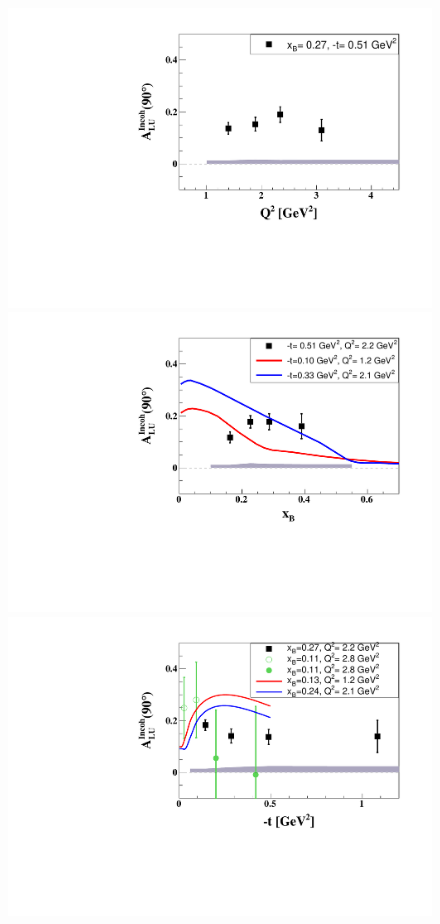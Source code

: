 \begin{figure}[tpb]
   \centering
\includegraphics[scale=0.48]{fig_Dec2016/ALU_90_p_vs_Q2_shortscenrario.pdf}\\ 
\includegraphics[scale=0.48]{fig_Dec2016/ALU_90_p_vs_x_shortscenrario.pdf}\\
\includegraphics[scale=0.48]{fig_Dec2016/ALU_90_p_vs_t_shortscenrario.pdf} \\ 

\end{figure}
